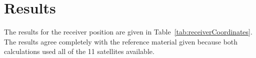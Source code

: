 \section{Results} %
\label{sec:results}

The results for the receiver position are given in Table~\ref{tab:receiverCoordinates}.  The results agree completely with the reference material given because both calculations used all of the 11 satellites available.

